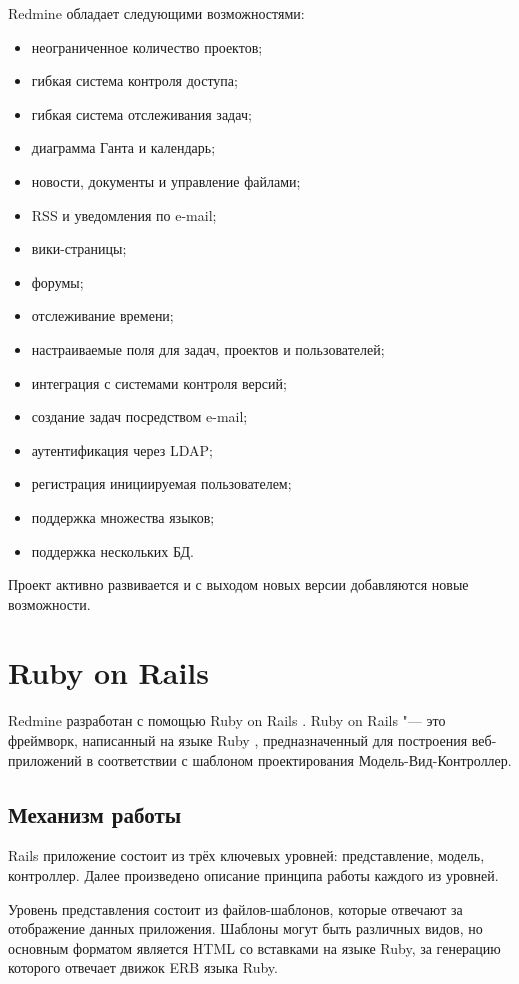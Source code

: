Redmine обладает следующими возможностями:
\begin{itemize}
  \item неограниченное количество проектов;
  \item гибкая система контроля доступа;
  \item гибкая система отслеживания задач;
  \item диаграмма Ганта и календарь;
  \item новости, документы и управление файлами;
  \item RSS и уведомления по e-mail;
  \item вики-страницы;
  \item форумы;
  \item отслеживание времени;
  \item настраиваемые поля для задач, проектов и пользователей;
  \item интеграция с системами контроля версий;
  \item создание задач посредством e-mail;
  \item аутентификация через LDAP;
  \item регистрация инициируемая пользователем;
  \item поддержка множества языков;
  \item поддержка нескольких БД.
\end{itemize}
Проект активно развивается и с выходом новых версии добавляются новые
возможности.

\section{Ruby on Rails}

Redmine разработан с помощью Ruby on Rails \cite{rails}. Ruby on
Rails "--- это фреймворк, написанный на языке Ruby \cite{ruby}, предназначенный
для построения веб-приложений в соответствии с шаблоном проектирования
Модель-Вид-Контроллер. 

\subsection{Механизм работы}
Rails приложение состоит из трёх ключевых уровней: представление, модель,
контроллер. Далее произведено описание принципа работы каждого из уровней.

Уровень представления состоит из файлов-шаблонов, которые отвечают за
отображение данных приложения. Шаблоны могут быть различных видов, но основным
форматом является HTML со вставками на языке Ruby, за генерацию которого
отвечает движок ERB языка Ruby.

